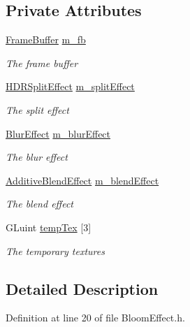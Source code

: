 \subsection*{Private Attributes}
\begin{DoxyCompactItemize}
\item 
\hyperlink{class_frame_buffer}{Frame\+Buffer} \hyperlink{class_bloom_effect_a6e92b45d7d260f5aa0dcf3a299b28cfe}{m\+\_\+fb}
\begin{DoxyCompactList}\small\item\em The frame buffer \end{DoxyCompactList}\item 
\hyperlink{class_h_d_r_split_effect}{H\+D\+R\+Split\+Effect} \hyperlink{class_bloom_effect_aabecb4a9b579674d07806b3676a26d52}{m\+\_\+split\+Effect}
\begin{DoxyCompactList}\small\item\em The split effect \end{DoxyCompactList}\item 
\hyperlink{class_blur_effect}{Blur\+Effect} \hyperlink{class_bloom_effect_abc532338b21e4a70dac9a4e98bff00ae}{m\+\_\+blur\+Effect}
\begin{DoxyCompactList}\small\item\em The blur effect \end{DoxyCompactList}\item 
\hyperlink{class_additive_blend_effect}{Additive\+Blend\+Effect} \hyperlink{class_bloom_effect_a2227e1cb8bf17f584ef22b8320d4bf01}{m\+\_\+blend\+Effect}
\begin{DoxyCompactList}\small\item\em The blend effect \end{DoxyCompactList}\item 
G\+Luint \hyperlink{class_bloom_effect_a74ea9780de0ea8954b981dbaa61b3aa4}{temp\+Tex} \mbox{[}3\mbox{]}
\begin{DoxyCompactList}\small\item\em The temporary textures \end{DoxyCompactList}\end{DoxyCompactItemize}


\subsection{Detailed Description}


Definition at line 20 of file Bloom\+Effect.\+h.



